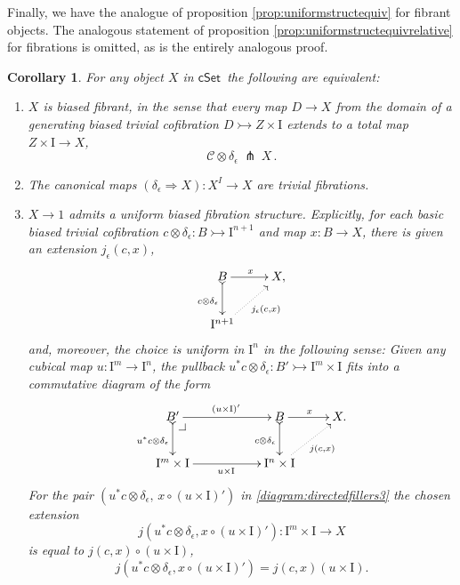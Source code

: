 \documentclass[11pt]{amsart}
\makeatletter
\newcommand{\cSet}{\ensuremath{\mathsf{cSet}}}
\newcommand{\mono}{\ensuremath{\rightarrowtail}}
\newcommand{\ra}{\ensuremath{\rightarrow}}
\renewcommand{\to}{\ensuremath{\rightarrow}}
\newcommand{\I}{\ensuremath{\mathrm{I}}}
\newtheorem{corollary}[theorem]{Corollary}
\theoremstyle{remark}
\theoremstyle{definition}
\newcommand{\pbcorner}[1][dr]{\save*!/#1-1.2pc/#1:(-1,1)@^{|-}\restore}
\makeatother
\begin{document}
Finally, we have the analogue of proposition \ref{prop:uniformstructequiv} for fibrant objects. The analogous statement of proposition \ref{prop:uniformstructequivrelative} for fibrations is omitted, as is the entirely analogous proof.

\begin{corollary}\label{cor:uniformfibstructequiv}  For any object $X$ in \cSet\ the following are equivalent:
\begin{enumerate}
\item $X$ is \emph{biased fibrant}, in the sense that every map $D\to X$ from the domain of a generating biased trivial cofibration $D \mono Z \times \I$ extends to a total map $Z \times \I \ra X$,
$$\mathcal{C}\otimes \delta_\epsilon\ \pitchfork\ X\,.$$

\item The canonical maps $(\delta_\epsilon\Rightarrow{X}) : X^I \ra X$ are trivial fibrations.

\item $X\ra 1$ admits a \emph{uniform biased fibration structure}.  Explicitly, for each basic biased trivial cofibration $c \otimes \delta_\epsilon : B \mono \I^{n+1}$ and map $x : B\ra X$, there is given an extension $j_\epsilon(c,x)$,
\begin{equation}\label{diagram:directedfillers2.5}
\xymatrix{
B \ar@{>->}[d]_{c \otimes \delta_\epsilon} \ar[r]^{x} & X, \\
\I^{n+1}\ar@{.>}[ru]_{j_\epsilon(c,x)} &
}
\end{equation}
and, moreover,  the choice is \emph{uniform in $\I^n$} in the following sense: Given any cubical map $u : \I^m \ra \I^n$, the pullback  $u^*c \otimes \delta_\epsilon : B'\mono \I^{m}\times\I$ fits into a commutative diagram of the form
\begin{equation}\label{diagram:directedfillers3}
\xymatrix{
B' \ar@{>->}[d]_{u^*c \otimes \delta_\epsilon} \ar[rr]^{(u\times\I)'} \pbcorner &&  B \ar@{>->}[d]_{c \otimes \delta_\epsilon } \ar[r]^{x} & X. \\
\I^{m}\times\I \ar[rr]_{u\times\I } && \I^{n}\times\I \ar@{.>}[ru]_{j(c,x)} &
}
\end{equation}
For the pair $(u^*c \otimes \delta_\epsilon,\, x\circ (u\times\I)')$ in \eqref{diagram:directedfillers3} the chosen extension $$j(u^*c \otimes \delta_\epsilon,x\circ (u\times\I)'): \I^m\times\I \ra X$$ is equal to  $j(c,x)\circ (u\times\I)$,
\begin{equation}\label{eq:uniformfillers2}
j(u^*c \otimes \delta_\epsilon,x\circ(u\times\I)') = j(c,x) (u\times\I).
\end{equation}
\end{enumerate}
\end{corollary}
\end{document}
